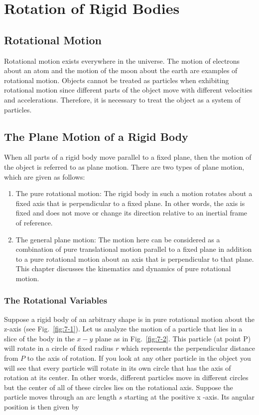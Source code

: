 \documentclass[10pt]{article}
\numberwithin{equation}{section}
\begin{document}
\section{Rotation of Rigid Bodies}\label{chap:7}
\subsection{Rotational Motion}\label{sec:7-1}
Rotational motion exists everywhere in the universe. The motion of electrons about an atom and the motion of the moon about the earth are examples of rotational motion. Objects cannot be treated as particles when exhibiting rotational motion since different parts of the object move with different velocities and accelerations. Therefore, it is necessary to treat the object as a system of particles.

\subsection{The Plane Motion of a Rigid Body}\label{sec:7-2}
When all parts of a rigid body move parallel to a fixed plane, then the motion of the object is referred to as plane motion. There are two types of plane motion, which are given as follows:

\begin{enumerate}
  \item The pure rotational motion: The rigid body in such a motion rotates about a fixed axis that is perpendicular to a fixed plane. In other words, the axis is fixed and does not move or change its direction relative to an inertial frame of reference.
  \item The general plane motion: The motion here can be considered as a combination of pure translational motion parallel to a fixed plane in addition to a pure rotational motion about an axis that is perpendicular to that plane. This chapter discusses the kinematics and dynamics of pure rotational motion.
\end{enumerate}

\subsubsection{The Rotational Variables}\label{sec:7-2-1}
Suppose a rigid body of an arbitrary shape is in pure rotational motion about the z-axis (see Fig.~\ref{fig:7-1}). Let us analyze the motion of a particle that lies in a slice of the body in the $x-y$ plane as in Fig.~\ref{fig:7-2}. This particle (at point P) will rotate in a circle of fixed radius $r$ which represents the perpendicular distance from $P$ to the axis of rotation. If you look at any other particle in the object you will see that every particle will rotate in its own circle that has the axis of rotation at its center. In other words, different particles move in different circles but the center of all of these circles lies on the rotational axis. Suppose the particle moves through an arc length $s$ starting at the positive x -axis. Its angular position is then given by
\end{document}
